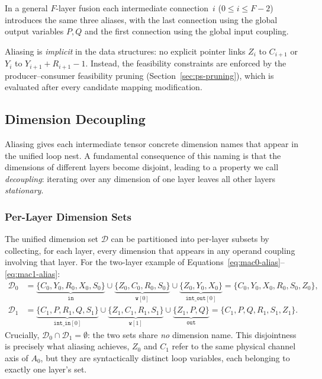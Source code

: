 \noindent
In a general $F$-layer fusion each intermediate connection~$i$
($0 \le i \le F\!-\!2$) introduces the same three aliases, with
the last connection using the global output variables $P, Q$ and the
first connection using the global input coupling.

Aliasing is \emph{implicit} in the data structures: no explicit
pointer links $Z_i$ to $C_{i+1}$ or $Y_i$ to $Y_{i+1} + R_{i+1} - 1$.
Instead, the feasibility constraints are enforced by the producer--consumer
feasibility pruning (Section~\ref{sec:ps-pruning}), which is
evaluated after every candidate mapping modification.


\subsection{Dimension Decoupling}
\label{sec:ps-decoupling}

Aliasing gives each intermediate tensor concrete dimension names that
appear in the unified loop nest.
A fundamental consequence of this naming is that the dimensions of
different layers become disjoint, leading to a property we
call \emph{decoupling}: iterating over any dimension of one layer
leaves all other layers \emph{stationary}.


\subsubsection{Per-Layer Dimension Sets}
\label{sec:ps-decouple-sets}

The unified dimension set
$\mathcal{D}$ can be partitioned into
per-layer subsets by collecting, for each layer, every dimension that
appears in any operand coupling involving that layer.
For the two-layer example of
Equations~\ref{eq:mac0-alias}--\ref{eq:mac1-alias}:
\begingroup
\small
\begin{align}
  \mathcal{D}_0 &= \underbrace{\{C_0, Y_0, R_0, X_0, S_0\}}_{\texttt{in}}
                 \cup
                 \underbrace{\{Z_0, C_0, R_0, S_0\}}_{\texttt{w}[0]}
                 \cup
                 \underbrace{\{Z_0, Y_0, X_0\}}_{\texttt{int\_out}[0]}
                 =
                 \{C_0, Y_0, X_0, R_0, S_0, Z_0\}, 
  \label{eq:D0-dims} \\[6pt]
  \mathcal{D}_1 &= \underbrace{\{C_1, P, R_1, Q, S_1\}}_{\texttt{int\_in}[0]}
                 \cup
                 \underbrace{\{Z_1, C_1, R_1, S_1\}}_{\texttt{w}[1]}
                 \cup
                 \underbrace{\{Z_1, P, Q\}}_{\texttt{out}}
                 =
                 \{C_1, P, Q, R_1, S_1, Z_1\}.
  \label{eq:D1-dims}
\end{align}
\endgroup
Crucially, $\mathcal{D}_0 \cap \mathcal{D}_1 = \emptyset$: the two
sets share \emph{no} dimension name.
This disjointness is precisely what aliasing achieves, $Z_0$ and
$C_1$ refer to the same physical channel axis of $A_0$, but they are
syntactically distinct loop variables, each belonging to exactly one
layer's set.

